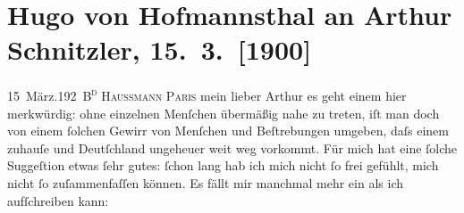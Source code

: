 

         
         \newcommand{\erwaehntePersonen}{Personen: Richard Beer-Hofmann, Anatole France, Paul Goldmann, Hugo August von Hofmannsthal, Maurice Maeterlinck, Theofrastus Bombastus Paracelsus, Marie Reinhard, Auguste Rodin}
         \newcommand{\erwaehnteInstitutionen}{}
         \newcommand{\erwaehnteOrte}{Orte: Berlin, Bois de Boulogne, Boulevard Haussmann, Deutschland, Florenz, Meudon, Paris, Villennes-sur-Seine, Wien}
         \newcommand{\erwaehnteWerke}{Werke: Antigone, Paracelsus und Dr. Schnitzler, Vorspiel zur Antigone des Sophokles}
               \section[Hugo von Hofmannsthal an Arthur Schnitzler, 15. 3. {[}1900{]}]{ Hugo von Hofmannsthal an Arthur Schnitzler,
               15. 3. {[}1900{]}}\nopagebreak{}\rehead{ }\begin{ledgroupsized}[t]{13cm}\normalsize\beginnumbering \toendnotes[C]{\smallbreak\pagebreak[2]} 
\toendnotes[C]{\smallbreak}\pstart
           \noindent{}{\pb}15 März.\hfill \textsc{192 B\textsuperscript{d}
                           Haussmann}\pend
           \pstart
           \raggedleft{}\textsc{Paris}\pend
           \pstart{}mein lieber Arthur\pend\pstart
           es geht einem hier merkwürdig: ohne einzelnen Menſchen übermäßig nahe zu treten, iſt
               man doch von einem ſolchen Gewirr von Menſchen und Beſtrebungen umgeben, daſs einem
               zuhauſe und Deutſchland ungeheuer weit weg vorkommt.
               Für mich hat eine ſolche Suggeſtion etwas ſehr gutes: ſchon lang hab ich mich nicht
               ſo frei gefühlt, mich {\pb}nicht ſo
               zuſammenfaſſen können. Es fällt mir manchmal mehr ein als ich aufſchreiben kann:

\end{ledgroupsized}
